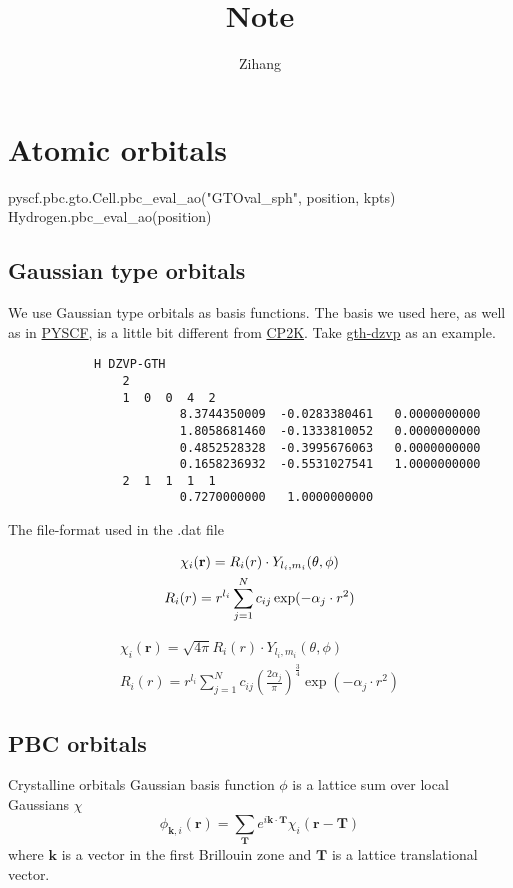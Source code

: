 \documentclass{article}
\title{Note}
\author{Zihang}
\begin{document}
\maketitle
\section{Atomic orbitals}
    pyscf.pbc.gto.Cell.pbc\_eval\_ao("GTOval\_sph", position, kpts)\\
    Hydrogen.pbc\_eval\_ao(position)
    
    \subsection{Gaussian type orbitals}
        We use Gaussian type orbitals as basis functions.
        The basis we used here, as well as in \href{https://pyscf.org/}{PYSCF},
        is a little bit different from \href{https://www.cp2k.org/basis_sets}{CP2K}.
        Take \href{https://github.com/pyscf/pyscf/blob/master/pyscf/pbc/gto/basis/gth-dzvp.dat}{gth-dzvp} as an example.
        \begin{lstlisting}
            H DZVP-GTH
                2
                1  0  0  4  2
                        8.3744350009  -0.0283380461   0.0000000000
                        1.8058681460  -0.1333810052   0.0000000000
                        0.4852528328  -0.3995676063   0.0000000000
                        0.1658236932  -0.5531027541   1.0000000000
                2  1  1  1  1
                        0.7270000000   1.0000000000
        \end{lstlisting}
        The file-format used in the .dat file

        \begin{gather}
            \chi_i(\textbf{r}) = R_i(r)\cdot Y_{l_i,m_i}(\theta,\phi) \notag \\
            R_i(r) = r^{l_i}\sum_{j=1}^Nc_{ij}\exp(-\alpha_j\cdot r^2) \notag
        \end{gather}

        \begin{gather}
            \chi_i(\textbf{r}) = \sqrt{4\pi}R_i(r)\cdot Y_{l_i,m_i}(\theta,\phi) \\
            R_i(r) = r^{l_i}\sum_{j=1}^Nc_{ij}\left(\frac{2\alpha_{j}}{\pi}\right)^{\frac{3}{4}}\exp(-\alpha_{j}\cdot r^2)
        \end{gather}

    \subsection{PBC orbitals}
    Crystalline orbitals Gaussian basis function $\phi$ is a lattice sum over local Gaussians $\chi$
    \begin{equation}
        \phi_{\textbf{k},i}(\textbf{r}) = \sum_{\textbf{T}}e^{i\textbf{k}\cdot\textbf{T}}\chi_i(\textbf{r}-\textbf{T})
    \end{equation}
    where $\textbf{k}$ is a vector in the first Brillouin zone and $\textbf{T}$ is a lattice translational vector.
\end{document}
